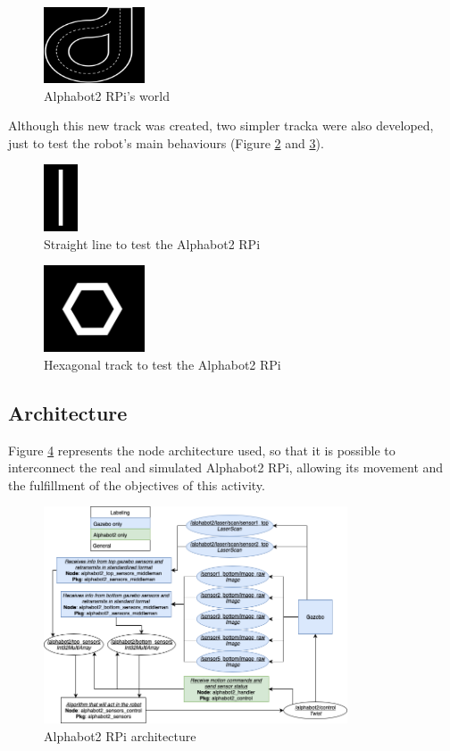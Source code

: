 \documentclass[conference]{IEEEtran}
\begin{document}
\begin{figure}[H]
    \centering
    \includegraphics[width=3cm]{AB2-track.png}
    \caption{Alphabot2 RPi's world}
    \label{fig:fig7}
\end{figure}

Although this new track was created, two simpler tracka were also developed, just to test the robot's main behaviours (Figure \ref{fig:fig8} and \ref{fig:fig81}).

\begin{figure}[H]
    \centering
    \includegraphics[width=1cm]{AB2-track2.png}
    \caption{Straight line to test the Alphabot2 RPi}
    \label{fig:fig8}
\end{figure}

\begin{figure}[H]
    \centering
    \includegraphics[width=3cm]{AB2-track3.png}
    \caption{Hexagonal track to test the Alphabot2 RPi}
    \label{fig:fig81}
\end{figure}


\subsection{Architecture} \label{ros}

Figure \ref{fig:fig9} represents the node architecture used, so that it is possible to interconnect the real and simulated Alphabot2 RPi, allowing its movement and the fulfillment of the objectives of this activity.

\begin{figure}[H]
    \centering
    \includegraphics[width=9cm]{arch.png}
    \caption{Alphabot2 RPi architecture}
    \label{fig:fig9}
\end{figure}
\end{document}
